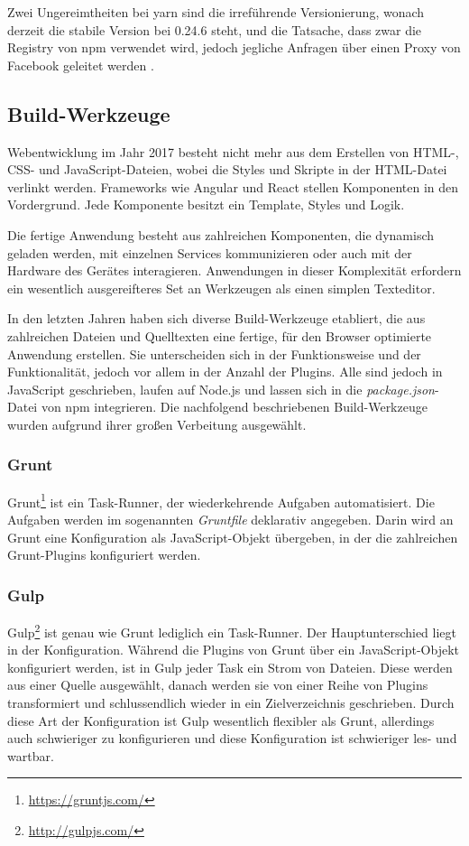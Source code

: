 Zwei Ungereimtheiten bei yarn sind die irreführende Versionierung, wonach derzeit die stabile Version bei 0.24.6 steht, und die Tatsache, dass zwar die Registry von npm verwendet wird, jedoch jegliche Anfragen über einen Proxy von Facebook geleitet werden \autocite{Nemeth.yarnpkg:online}.


\subsection{Build-Werkzeuge}
\label{sub:build-tools}
Webentwicklung im Jahr 2017 besteht nicht mehr aus dem Erstellen von HTML-, CSS- und JavaScript-Dateien, wobei die Styles und Skripte in der HTML-Datei verlinkt werden.
Frameworks wie Angular und React stellen Komponenten in den Vordergrund.
Jede Komponente besitzt ein Template, Styles und Logik.

Die fertige Anwendung besteht aus zahlreichen Komponenten, die dynamisch geladen werden, mit einzelnen Services kommunizieren oder auch mit der Hardware des Gerätes interagieren.
Anwendungen in dieser Komplexität erfordern ein wesentlich ausgereifteres Set an Werkzeugen als einen simplen Texteditor.

In den letzten Jahren haben sich diverse Build-Werkzeuge etabliert, die aus zahlreichen Dateien und Quelltexten eine fertige, für den Browser optimierte Anwendung erstellen.
Sie unterscheiden sich in der Funktionsweise und der Funktionalität, jedoch vor allem in der Anzahl der Plugins.
Alle sind jedoch in JavaScript geschrieben, laufen auf Node.js und lassen sich in die \emph{package.json}-Datei von npm integrieren.
Die nachfolgend beschriebenen Build-Werkzeuge wurden aufgrund ihrer großen Verbeitung ausgewählt.

\subsubsection{Grunt}
\label{sub:grunt}
Grunt\footnote{\url{https://gruntjs.com/}} ist ein Task-Runner, der wiederkehrende Aufgaben automatisiert.
Die Aufgaben werden im sogenannten \emph{Gruntfile} deklarativ angegeben.
Darin wird an Grunt eine Konfiguration als JavaScript-Objekt übergeben, in der die zahlreichen Grunt-Plugins konfiguriert werden.

\subsubsection{Gulp}
\label{sub:gulp}
Gulp\footnote{\url{http://gulpjs.com/}} ist genau wie Grunt lediglich ein Task-Runner.
Der Hauptunterschied liegt in der Konfiguration.
Während die Plugins von Grunt über ein JavaScript-Objekt konfiguriert werden, ist in Gulp jeder Task ein Strom von Dateien.
Diese werden aus einer Quelle ausgewählt, danach werden sie von einer Reihe von Plugins transformiert und schlussendlich wieder in ein Zielverzeichnis geschrieben.
Durch diese Art der Konfiguration ist Gulp wesentlich flexibler als Grunt, allerdings auch schwieriger zu konfigurieren und diese Konfiguration ist schwieriger les- und wartbar.


